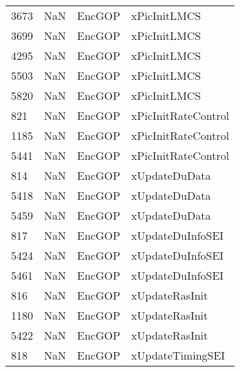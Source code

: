 \begin{tabular}{llll}
3673 &                   NaN &                     EncGOP &                              xPicInitLMCS \\
3699 &                   NaN &                     EncGOP &                              xPicInitLMCS \\
4295 &                   NaN &                     EncGOP &                              xPicInitLMCS \\
5503 &                   NaN &                     EncGOP &                              xPicInitLMCS \\
5820 &                   NaN &                     EncGOP &                              xPicInitLMCS \\
821  &                   NaN &                     EncGOP &                       xPicInitRateControl \\
1185 &                   NaN &                     EncGOP &                       xPicInitRateControl \\
5441 &                   NaN &                     EncGOP &                       xPicInitRateControl \\
814  &                   NaN &                     EncGOP &                             xUpdateDuData \\
5418 &                   NaN &                     EncGOP &                             xUpdateDuData \\
5459 &                   NaN &                     EncGOP &                             xUpdateDuData \\
817  &                   NaN &                     EncGOP &                          xUpdateDuInfoSEI \\
5424 &                   NaN &                     EncGOP &                          xUpdateDuInfoSEI \\
5461 &                   NaN &                     EncGOP &                          xUpdateDuInfoSEI \\
816  &                   NaN &                     EncGOP &                            xUpdateRasInit \\
1180 &                   NaN &                     EncGOP &                            xUpdateRasInit \\
5422 &                   NaN &                     EncGOP &                            xUpdateRasInit \\
818  &                   NaN &                     EncGOP &                          xUpdateTimingSEI \\

\end{tabular}
